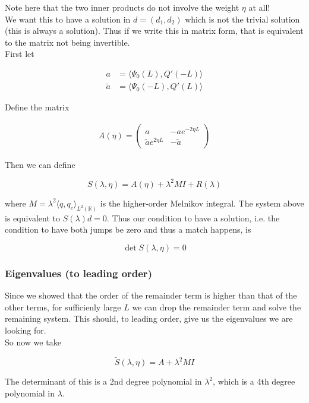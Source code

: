 \documentclass[12pt]{article}
\def\R{{\mathbb R}}
\begin{document}
Note here that the two inner products do not involve the weight $\eta$ at all! \\


We want this to have a solution in $d = (d_1, d_2)$ which is not the trivial solution (this is always a solution). Thus if we write this in matrix form, that is equivalent to the matrix not being invertible.\\

First let

\begin{align*}
a &= \langle \Psi_0 (L), Q'(-L) \rangle \\
\tilde{a} &= \langle \Psi_0(-L), Q'(L) \rangle
\end{align*}

Define the matrix

\begin{align*}
A(\eta) = \begin{pmatrix}
a & -a e^{-2 \eta L} \\ \tilde{a} e^{2 \eta L} & -\tilde{a} 
\end{pmatrix}
\end{align*}

Then we can define

\[
S(\lambda, \eta) = A(\eta) + \lambda^2 MI + R(\lambda) 
\]

where $M = \lambda^2 \langle q, q_c \rangle_{L^2(\R)}$ is the higher-order Melnikov integral. The system above is equivalent to $S(\lambda)d = 0$. Thus our condition to have a solution, i.e. the condition to have both jumps be zero and thus a match happens, is

\[
\det S(\lambda, \eta) = 0
\]

\subsubsection*{Eigenvalues (to leading order)}

Since we showed that the order of the remainder term is higher than that of the other terms, for sufficienly large $L$ we can drop the remainder term and solve the remaining system. This should, to leading order, give us the eigenvalues we are looking for.\\

So now we take

\[
\tilde{S}(\lambda, \eta) = A + \lambda^2 MI
\]

The determinant of this is a 2nd degree polynomial in $\lambda^2$, which is a 4th degree polynomial in $\lambda$.
\end{document}
